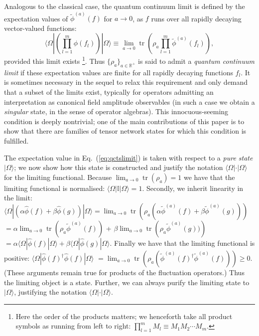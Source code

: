\documentclass[prl,twocolumn,lengthcheck,superscriptaddress]{revtex4-1}
\newcommand{\tr}{\operatorname{tr}}
\theoremstyle{definition}
\theoremstyle{remark}
\begin{document}
Analogous to the classical case, the quantum continuum limit is defined by the expectation values of $\widetilde{\phi}^{(a)}(f)$ for $a\rightarrow 0$, as $f$ runs over all rapidly decaying vector-valued functions:
\begin{equation}\label{eq:qctslimit}
	\langle\Omega|\left(\prod_{l=1}^m\widehat{\phi}(f_l)\right)|\Omega\rangle \equiv \lim_{a\rightarrow 0} \tr\left(\rho_a \prod_{l=1}^m\widetilde{\phi}^{(a)}(f_l)\right),
\end{equation}
provided this limit exists \footnote{Here the order of the products matters; we henceforth take all product symbols as running from left to right: $\prod_{l=1}^m M_l \equiv M_1M_2\cdots M_m$.}. Thus $\{\rho_a\}_{a\in\mathbb{R}^+}$ is said to admit a \emph{quantum continuum limit} if these expectation values are finite for all rapidly decaying functions $f_l$. It is sometimes necessary in the sequel to relax this requirement and only demand that a subset of the limits exist, typically for operators admitting an interpretation as canonical field amplitude observables (in such a case we obtain a \emph{singular} state, in the sense of operator algebras). This innocuous-seeming condition is deeply nontrivial; one of the main contributions of this paper is to show that there are families of tensor network states for which this condition is fulfilled. 

The expectation value in Eq.~(\ref{eq:qctslimit}) is taken with respect to a \emph{pure state} $|\Omega\rangle$; we now show how this state is constructed and justify the notation $\langle\Omega|\cdot |\Omega\rangle$ for the limiting functional. Because $\lim_{a\rightarrow0} \tr(\rho_a) = 1$ we have that the limiting functional is normalised: $\langle\Omega| \mathbb{I} |\Omega\rangle = 1$. Secondly, we inherit linearity in the limit: $\langle \Omega| (\alpha \widehat{\phi}(f) + \beta\widehat{\phi}(g))|\Omega\rangle = \lim_{a\rightarrow 0} \tr\left(\rho_a \left(\alpha \widetilde{\phi}^{(a)}(f) + \beta \widetilde{\phi}^{(a)}(g)\right) \right)$ $= \alpha\lim_{a\rightarrow 0} \tr\left(\rho_a  \widetilde{\phi}^{(a)}(f)\right)$ + $\beta\lim_{a\rightarrow 0} \tr\left(\rho_a \widetilde{\phi}^{(a)}(g)) \right)$ $=  \alpha \langle \Omega| \widehat{\phi}(f) |\Omega\rangle+ \beta\langle \Omega|\widehat{\phi}(g)|\Omega\rangle$. Finally we have that the limiting functional is positive: $\langle\Omega | \widehat{\phi}(f)^\dag \widehat{\phi}(f) |\Omega\rangle$ $= \lim_{a\rightarrow 0} \tr(\rho_a (\widetilde{\phi}^{(a)}(f)^\dag \widetilde{\phi}^{(a)}(f))) \ge 0$. (These arguments remain true for products of the fluctuation operators.) Thus the limiting object is a state. Further, we can always purify the limiting state to $|\Omega\rangle$, justifying the notation $\langle \Omega|\cdot|\Omega\rangle$.
\end{document}
